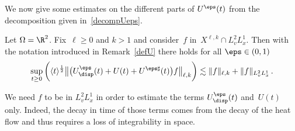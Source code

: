 We now give some estimates on the different parts of $U^\eps(t)$ from the decomposition given in~\eqref{decompUeps}.

\begin{lemm}\label{lem:Uepsdisp}
Let $\Omega = \R^2$. Fix~$\ell \ge0$ and ${k>1}$ and consider~$f$ in~$X^{\ell,k} \cap L^{2}_v L^1_x$. Then with the notation introduced in Remark~\ref{defU} there holds for all $\eps \in (0,1)$
\[
\sup_{t \ge 0} \bigg(\langle t \rangle^{\frac12} \big\|\big(U^\eps_{\disp}(t) +U(t) + U^{\eps \sharp}(t)\big) f\big \|_{\ell,k}\bigg) \lesssim \|f\|_{\ell,k} + \|f\|_{L^{2}_v L^1_x} \,.
\]
\end{lemm}

\begin{rema}
We need $f$ to be in $L^{2}_v L^1_x$ in order to estimate the terms $U^\eps_{\disp}(t)$ and~$U(t)$ only. Indeed, the decay in time of those terms comes from the decay of the heat flow and thus requires a loss of integrability in space.
\end{rema}

